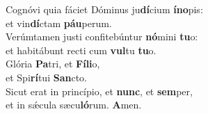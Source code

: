 \oddverse Cognóvi quia fáciet Dóminus ju\textbf{dí}cium \textbf{í}\textbf{no}pis:~\*\\
\oddverse et vin\textbf{dí}ctam \textbf{páu}perum.\\
\evenverse Verúmtamen justi confitebúntur \textbf{nó}mini \textbf{tu}o:~\*\\
\evenverse et habitábunt recti cum \textbf{vul}tu \textbf{tu}o.\\
\oddverse Glória \textbf{Pa}tri, et \textbf{Fí}\textbf{li}o,~\*\\
\oddverse et Spi\textbf{rí}tui \textbf{San}cto.\\
\evenverse Sicut erat in princípio, et \textbf{nunc}, et \textbf{sem}per,~\*\\
\evenverse et in sǽcula sæcu\textbf{ló}rum. \textbf{A}men.\\
